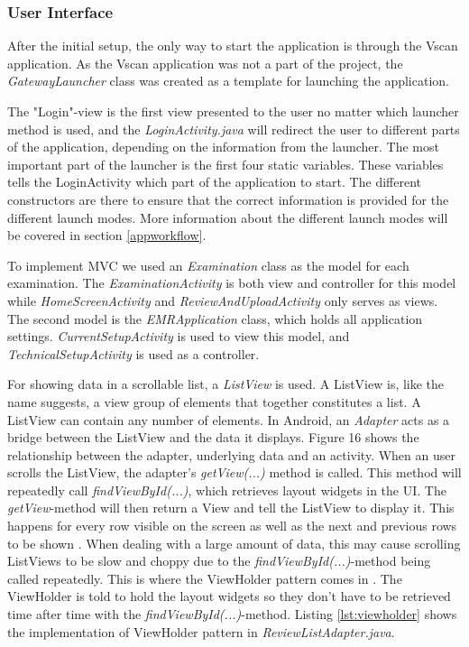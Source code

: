 \subsubsection{User Interface}
\label{viewholderImp} 

After the initial setup, the only way to start the application is through the Vscan application. As the Vscan application was not a part of the project, the \emph{GatewayLauncher} class was created as a template for launching the application.

The "Login"-view is the first view presented to the user no matter which launcher method is used, and the \emph{LoginActivity.java} will redirect the user to different parts of the application, depending on the information from the launcher. The most important part of the launcher is the first four static variables. These variables tells the LoginActivity which part of the application to start. The different constructors are there to ensure that the correct information is provided for the different launch modes. More information about the different launch modes will be covered in section \ref{appworkflow}.

To implement MVC we used an \emph{Examination} class as the model for each examination. The \emph{ExaminationActivity} is both view and controller for this model while \emph{HomeScreenActivity} and \emph{ReviewAndUploadActivity} only serves as views. The second model is the \emph{EMRApplication} class, which holds all application settings. \emph{CurrentSetupActivity} is used to view this model, and \emph{TechnicalSetupActivity} is used as a controller.

For showing data in a scrollable list, a \emph{ListView} is used. A ListView is, like the name suggests, a view group of elements that together constitutes a list. A ListView can contain any number of elements. In Android, an \emph{Adapter} acts as a bridge between the ListView and the data it displays. Figure 16 shows the relationship between the adapter, underlying data and an activity. When an user scrolls the ListView, the adapter's \emph{getView(...)} method is called. This method will repeatedly call \emph{findViewById(...)}, which retrieves layout widgets in the UI. The \emph{getView}-method will then return a View and tell the ListView to display it. This happens for every row visible on the screen as well as the next and previous rows to be shown \cite{adapter}. When dealing with a large amount of data, this may cause scrolling ListViews to be slow and choppy due to the \emph{findViewById(...)}-method being called repeatedly. This is where the ViewHolder pattern comes in \cite{viewholder}. The ViewHolder is told to hold the layout widgets so they don't have to be retrieved time after time with the \emph{findViewById(...)}-method. Listing \ref{lst:viewholder} shows the implementation of ViewHolder pattern in \emph{ReviewListAdapter.java}.


